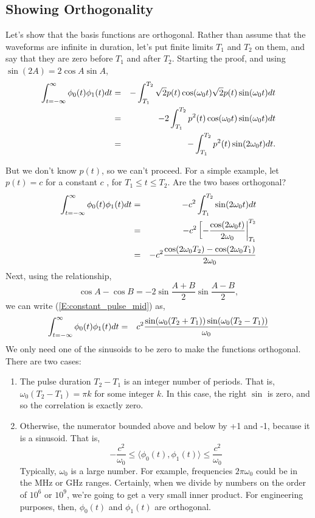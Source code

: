 \subsection{Showing Orthogonality}

Let's show that the basis functions are orthogonal.  Rather than assume that the waveforms are infinite in duration, let's put finite limits $T_1$ and $T_2$ on them, and say that they are zero before $T_1$ and after $T_2$.  Starting the proof, and using $\sin (2 A) = 2 \cos A \sin A$,
\begin{eqnarray}
  {\int_{t = -\infty}^{\infty} \phi_0(t)\phi_1(t) d{t} }  &=&
    - \int_{T_1}^{T_2} \sqrt{2} p(t) \cos(\omega_0 t) \sqrt{2} p(t) \sin(\omega_0
    t) dt \nonumber \\ 
    &=& - 2 \int_{T_1}^{T_2} p^2(t) \cos(\omega_0 t) \sin(\omega_0 t) dt \nonumber \\ 
    &=& - \int_{T_1}^{T_2} p^2(t) \sin(2 \omega_0 t) dt. \nonumber
\end{eqnarray}

But we don't know $p(t)$, so we can't proceed.  For a simple example, let $p(t)=c$ for a constant $c$ , for $T_1 \le t \le T_2$.  Are the two bases orthogonal?
\begin{eqnarray} \label{E:constant_pulse_mid}
  {\int_{t = -\infty}^{\infty} \phi_0(t)\phi_1(t) d{t} }
    &=&  - c^2 \int_{T_1}^{T_2}  \sin(2 \omega_0 t) dt \nonumber \\ 
    &=&  - c^2 \left[  - \frac{\cos(2 \omega_0 t)}{2\omega_0} \right|_{T_1}^{T_2} \nonumber \\ 
    &=&  - c^2 \frac{\cos(2 \omega_0 T_2) - \cos(2 \omega_0 T_1)}{2\omega_0} 
\end{eqnarray}
Next, using the relationship,
\begin{equation}
  \cos A - \cos B = -2\sin  \frac{A + B}{2}  \sin \frac{A - B}{2}, 
\end{equation}
we can write (\ref{E:constant_pulse_mid}) as,
\begin{eqnarray}
 {\int_{t = -\infty}^{\infty} \phi_0(t)\phi_1(t) d{t} } 
    &=&  c^2 \frac{\sin(\omega_0 (T_2+T_1)) \sin(\omega_0 (T_2-T_1))}{\omega_0}
    \nonumber
\end{eqnarray}
We only need one of the sinusoids to be zero to make the functions orthogonal.  There are two cases:
\begin{enumerate}
  \item The pulse duration $T_2-T_1$ is an integer number of
  periods.  That is, $\omega_0 (T_2-T_1) = \pi k$ for some integer
  $k$.  In this case, the right $\sin$ is zero, and so the
  correlation is exactly zero.
  \item Otherwise, the numerator bounded above and below by +1 and
  -1, because it is a sinusoid.  That is,
  \[
    -\frac{c^2}{\omega_0} \le \langle \phi_0(t), \phi_1(t) \rangle \le \frac{c^2}{\omega_0}
  \]
  Typically, $\omega_0$ is a large number.  For example, frequencies $2\pi \omega_0$ could be
  in the MHz or GHz ranges.  Certainly, when we divide by numbers on the order of $10^6$ or
  $10^9$, we're going to get a very small inner product.  For
  engineering purposes, then, $\phi_0(t)$ and $\phi_1(t)$ are orthogonal.
\end{enumerate}

